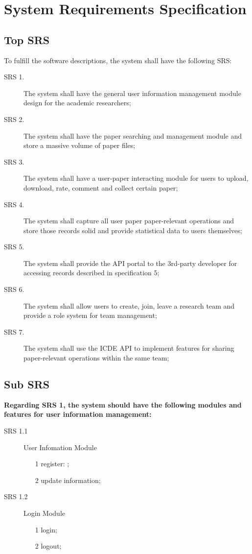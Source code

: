 \section{System Requirements Specification}
\noindent

\subsection*{Top SRS}
To fulfill the software descriptions, the system shall have the following SRS:

\begin{description}
    \item [SRS 1.] The system shall have the general user information management module design for the academic researchers;
    \item [SRS 2.] The system shall have the paper searching and management module and store a massive volume of paper files;
    \item [SRS 3.] The system shall have a user-paper interacting module for users to upload, download, rate, comment and collect certain paper;
    \item [SRS 4.] The system shall capture all user paper paper-relevant operations and store those records solid and provide statistical data to users themselves;
    \item [SRS 5.] The system shall provide the API portal to the 3rd-party developer for accessing records described in specification 5;
    \item [SRS 6.] The system shall allow users to create, join, leave a research team and provide a role system for team management;
    \item [SRS 7.] The system shall use the ICDE API to implement features for sharing paper-relevant operations within the same team;
\end{description}


\subsection*{Sub SRS}
\noindent
\textbf{Regarding SRS 1, the system should have the following modules and features for user information management:}

\begin{description}
    \item[SRS 1.1] User Infomation Module
        \begin{itemize}
            \item [1]
                register: ;
            \item [2]
                update information;
        \end{itemize} 
    \item[SRS 1.2] Login Module
        \begin{itemize}
            \item [1]
                login;
            \item [2]
                logout;
        \end{itemize} 
\end{description}

